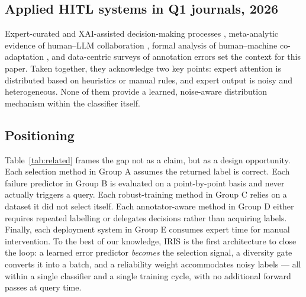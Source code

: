 \documentclass[a4paper,fleqn,longmktitle]{cas-sc}
\newcommand{\method}{IRIS}
\begin{document}
\subsection{Applied HITL systems in Q1 journals, 2026}
Expert-curated and XAI-assisted decision-making processes
\citep{petso2026,lou2026,feng2026,comito2026,piccoli2026,pensel2026},
meta-analytic evidence of human--LLM collaboration \citep{wang2026},
formal analysis of human--machine co-adaptation \citep{madduri2026},
and data-centric surveys of annotation errors \citep{hussain2026} set
the context for this paper. Taken together, they acknowledge two key
points: expert attention is distributed based on heuristics or manual
rules, and expert output is noisy and heterogeneous. None of them
provide a learned, noise-aware distribution mechanism within the
classifier itself.

\subsection{Positioning}
Table~\ref{tab:related} frames the gap not as a claim, but as a design
opportunity. Each selection method in Group A assumes the returned
label is correct. Each failure predictor in Group B is evaluated on a
point-by-point basis and never actually triggers a query. Each
robust-training method in Group C relies on a dataset it did not select
itself. Each annotator-aware method in Group D either requires repeated
labelling or delegates decisions rather than acquiring labels. Finally,
each deployment system in Group E consumes expert time for manual
intervention. To the best of our knowledge, \method{} is the first
architecture to close the loop: a learned error predictor
\emph{becomes} the selection signal, a diversity gate converts it into
a batch, and a reliability weight accommodates noisy labels --- all
within a single classifier and a single training cycle, with no
additional forward passes at query time.
\end{document}
